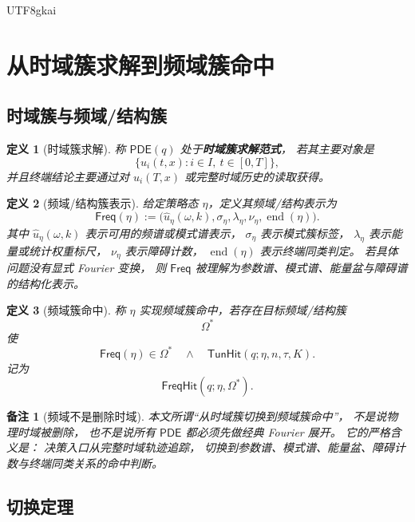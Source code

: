 \documentclass[12pt]{article}
\newtheorem{definition}{定义}[section]
\newtheorem{remark}{备注}[section]
\newcommand{\PDE}{\mathsf{PDE}}
\newcommand{\TunHit}{\mathsf{TunHit}}
\newcommand{\Freq}{\mathsf{Freq}}
\newcommand{\FreqHit}{\mathsf{FreqHit}}
\newcommand{\Endp}{\operatorname{end}}
\begin{document}
\begin{CJK*}{UTF8}{gkai}
\section{从时域簇求解到频域簇命中}
\label{sec:tex53-frequency}

\subsection{时域簇与频域/结构簇}
\label{subsec:tex53-time-frequency}

\begin{definition}[时域簇求解]
称 \(\PDE(q)\) 处于\textbf{时域簇求解范式}，
若其主要对象是
\[
  \{u_i(t,x):i\in I,\ t\in[0,T]\},
\]
并且终端结论主要通过对 \(u_i(T,x)\) 或完整时域历史的读取获得。
\end{definition}

\begin{definition}[频域/结构簇表示]
给定策略态 \(\eta\)，定义其频域/结构表示为
\[
  \Freq(\eta)
  :=
  \bigl(
    \widehat u_\eta(\omega,k),
    \sigma_\eta,
    \lambda_\eta,
    \nu_\eta,
    \Endp(\eta)
  \bigr).
\]
其中 \(\widehat u_\eta(\omega,k)\) 表示可用的频谱或模式谱表示，
\(\sigma_\eta\) 表示模式簇标签，
\(\lambda_\eta\) 表示能量或统计权重标尺，
\(\nu_\eta\) 表示障碍计数，
\(\Endp(\eta)\) 表示终端同类判定。
若具体问题没有显式 Fourier 变换，
则 \(\Freq\) 被理解为参数谱、模式谱、能量盆与障碍谱的结构化表示。
\end{definition}

\begin{definition}[频域簇命中]
称 \(\eta\) 实现频域簇命中，若存在目标频域/结构簇
\[
  \Omega^\ast
\]
使
\[
  \Freq(\eta)\in\Omega^\ast
  \quad\wedge\quad
  \TunHit(q;\eta,n,\tau,K).
\]
记为
\[
  \FreqHit(q;\eta,\Omega^\ast).
\]
\end{definition}

\begin{remark}[频域不是删除时域]
本文所谓“从时域簇切换到频域簇命中”，
不是说物理时域被删除，
也不是说所有 \(\PDE\) 都必须先做经典 Fourier 展开。
它的严格含义是：
决策入口从完整时域轨迹追踪，
切换到参数谱、模式谱、能量盆、障碍计数与终端同类关系的命中判断。
\end{remark}

\subsection{切换定理}
\label{subsec:tex53-switch}


\end{CJK*}
\end{document}
